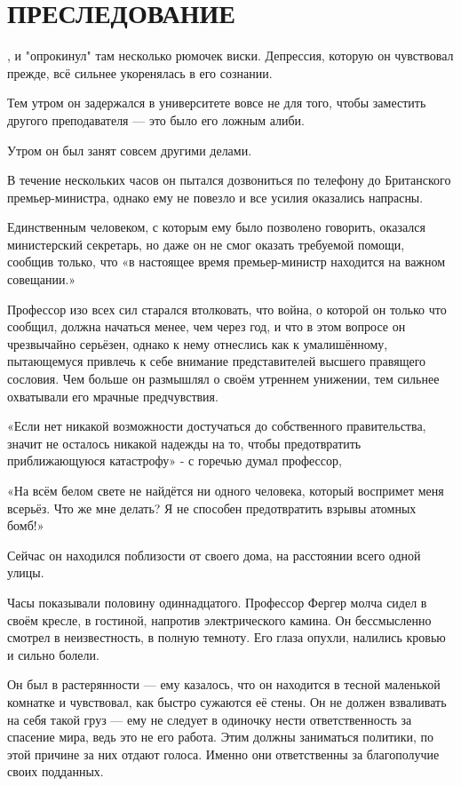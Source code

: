 \documentclass[a4paper,12pt]{book}
\begin{document}
\chapter{ПРЕСЛЕДОВАНИЕ}
\noindent{}, и "опрокинул" там несколько рюмочек виски. Депрессия, которую он чувствовал прежде, всё сильнее укоренялась в его сознании.
\par
Тем утром он задержался в университете вовсе не для того, чтобы заместить другого преподавателя — это было его ложным алиби.
\par
Утром он был занят совсем другими делами.
\par
В течение нескольких часов он пытался дозвониться по телефону до Британского премьер-министра, однако ему не повезло и все усилия оказались напрасны.
\par
Единственным человеком, с которым ему было позволено говорить, оказался министерский секретарь, но даже он не смог оказать требуемой помощи, сообщив только, что «в настоящее время премьер-министр находится на важном совещании.»
\par
Профессор изо всех сил старался втолковать, что война, о которой он только что сообщил, должна начаться менее, чем через год, и что в этом вопросе он чрезвычайно серьёзен, однако к нему отнеслись как к умалишённому, пытающемуся привлечь к себе внимание представителей высшего правящего сословия. Чем больше он размышлял о своём утреннем унижении, тем сильнее охватывали его мрачные предчувствия.
\par
«Если нет никакой возможности достучаться до собственного правительства, значит не осталось никакой надежды на то, чтобы предотвратить приближающуюся катастрофу» - с горечью думал профессор,
\par
«На всём белом свете не найдётся ни одного человека, который воспримет меня всерьёз. Что же мне делать? Я не способен предотвратить взрывы атомных бомб!»
\par
Сейчас он находился поблизости от своего дома, на расстоянии всего одной улицы.\\
\par
Часы показывали половину одиннадцатого. Профессор Фергер молча сидел в своём кресле, в гостиной, напротив электрического камина. Он бессмысленно смотрел в неизвестность, в полную темноту. Его глаза опухли, налились кровью и сильно болели.
\par
Он был в растерянности — ему казалось, что он находится в тесной маленькой комнатке и чувствовал, как быстро сужаются её стены. Он не должен взваливать на себя такой груз — ему не следует в одиночку нести ответственность за спасение мира, ведь это не его работа. Этим должны заниматься политики, по этой причине за них отдают голоса. Именно они ответственны за благополучие своих подданных.
\end{document}
